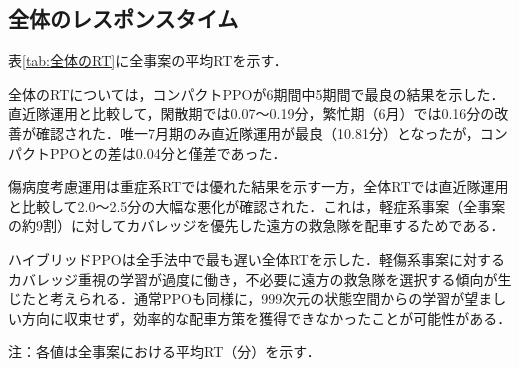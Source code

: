 \subsection{全体のレスポンスタイム}
表\ref{tab:全体のRT}に全事案の平均RTを示す．

全体のRTについては，コンパクトPPOが6期間中5期間で最良の結果を示した．直近隊運用と比較して，閑散期では0.07～0.19分，繁忙期（6月）では0.16分の改善が確認された．唯一7月期のみ直近隊運用が最良（10.81分）となったが，コンパクトPPOとの差は0.04分と僅差であった．

傷病度考慮運用は重症系RTでは優れた結果を示す一方，全体RTでは直近隊運用と比較して2.0～2.5分の大幅な悪化が確認された．これは，軽症系事案（全事案の約9割）に対してカバレッジを優先した遠方の救急隊を配車するためである．

ハイブリッドPPOは全手法中で最も遅い全体RTを示した．軽傷系事案に対するカバレッジ重視の学習が過度に働き，不必要に遠方の救急隊を選択する傾向が生じたと考えられる．通常PPOも同様に，999次元の状態空間からの学習が望ましい方向に収束せず，効率的な配車方策を獲得できなかったことが可能性がある．

\begin{table}
    \centering
    \caption{各テスト期間における配車手法別の全体RT（分）}
    \label{tab:全体のRT}
    \footnotesize
    \begin{flushleft}
    注：各値は全事案における平均RT（分）を示す．
    \end{flushleft}
\end{table}
\clearpage

